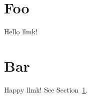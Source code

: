 \documentclass{article}
\begin{document}
\section{Foo}\label{sec:foo}

Hello \textsf{llmk}!

\section{Bar}

Happy \textsf{llmk}! See Section~\ref{sec:foo}.
\end{document}
